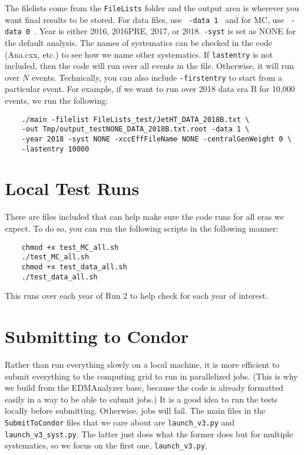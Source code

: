 \noindent The filelists come from the \verb|FileLists| folder and the output area is wherever you want final results to be stored. For data files, use \verb| -data 1 | and for MC, use \verb| -data 0 |. Year is either 2016, 2016PRE, 2017, or 2018. \verb|-syst| is set as NONE for the default analysis. The names of systematics can be checked in the code (Ana.cxx, etc.) to see how we name other systematics. If \verb|lastentry| is not included, then the code will run over all events in the file. Otherwise, it will run over $N$ events. Technically, you can also include \verb|-firstentry| to start from a particular event. For example, if we want to run over 2018 data era B for 10,000 events, we run the following:

\begin{verbatim}
    ./main -filelist FileLists_test/JetHT_DATA_2018B.txt \
    -out Tmp/output_testNONE_DATA_2018B.txt.root -data 1 \
    -year 2018 -syst NONE -xccEffFileName NONE -centralGenWeight 0 \
    -lastentry 10000
\end{verbatim}

\section{Local Test Runs}
There are files included that can help make sure the code runs for all eras we expect. To do so, you can run the following scripts in the following manner:

\begin{verbatim}
    chmod +x test_MC_all.sh
    ./test_MC_all.sh
    chmod +x test_data_all.sh
    ./test_data_all.sh
\end{verbatim}

\noindent This runs over each year of Run 2 to help check for each year of interest.

\section{Submitting to Condor}
Rather than run everything slowly on a local machine, it is more efficient to submit everything to the computing grid to run in parallelized jobs. (This is why we build from the EDMAnalyzer base, because the code is already formatted easily in a way to be able to submit jobs.) It is a good idea to run the tests locally before submitting. Otherwise, jobs will fail. The main files in the \verb|SubmitToCondor| files that we care about are \verb|launch_v3.py| and \verb|launch_v3_syst.py|. The latter just does what the former does but for multiple systematics, so we focus on the first one, \verb|launch_v3.py|.

